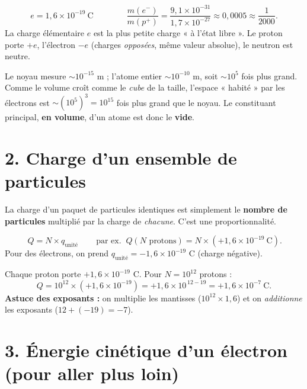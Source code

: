 \documentclass[11pt,a4paper]{article}
\newcommand{\pp}{p^{+}}
\newcommand{\ee}{e^{-}}
\begin{document}
\begin{formule}
\[ e = 1{,}6\times10^{-19}\ \text{C}
   \qquad\qquad
   \frac{m(\ee)}{m(\pp)} = \frac{9{,}1\times10^{-31}}{1{,}7\times10^{-27}} \approx 0{,}0005 \approx \frac{1}{2000}. \]
La charge élémentaire $e$ est la plus petite charge « à l'état libre ». Le proton porte $+e$,
l'électron $-e$ (charges \emph{opposées}, même valeur absolue), le neutron est neutre.
\end{formule}

\begin{cle}
Le noyau mesure $\sim 10^{-15}$ m ; l'atome entier $\sim 10^{-10}$ m, soit $\sim 10^{5}$ fois plus grand.
Comme le volume croît comme le \emph{cube} de la taille, l'espace « habité » par les électrons est
$\sim(10^{5})^{3}=10^{15}$ fois plus grand que le noyau. Le constituant principal, \textbf{en volume},
d'un atome est donc le \textbf{vide}.
\end{cle}

\section*{2. Charge d'un ensemble de particules}

La charge d'un paquet de particules identiques est simplement le \textbf{nombre de particules} multiplié
par la charge de \emph{chacune}. C'est une proportionnalité.

\begin{formule}
\[ \boxed{\,Q = N \times q_{\text{unité}}\,}
   \qquad\text{par ex. }\ Q(\text{$N$ protons}) = N \times (+1{,}6\times10^{-19}\ \text{C}). \]
Pour des électrons, on prend $q_{\text{unité}} = -1{,}6\times10^{-19}$ C (charge négative).
\end{formule}

\begin{ex}
Chaque proton porte $+1{,}6\times10^{-19}$ C. Pour $N=10^{12}$ protons :
\[ Q = 10^{12}\times(+1{,}6\times10^{-19}) = +1{,}6\times10^{\,12-19} = +1{,}6\times10^{-7}\ \text{C}. \]
\textbf{Astuce des exposants :} on multiplie les mantisses ($10^{12}\times1{,}6$) et on \emph{additionne}
les exposants ($12+(-19)=-7$).
\end{ex}

\section*{3. Énergie cinétique d'un électron (pour aller plus loin)}
\end{document}

